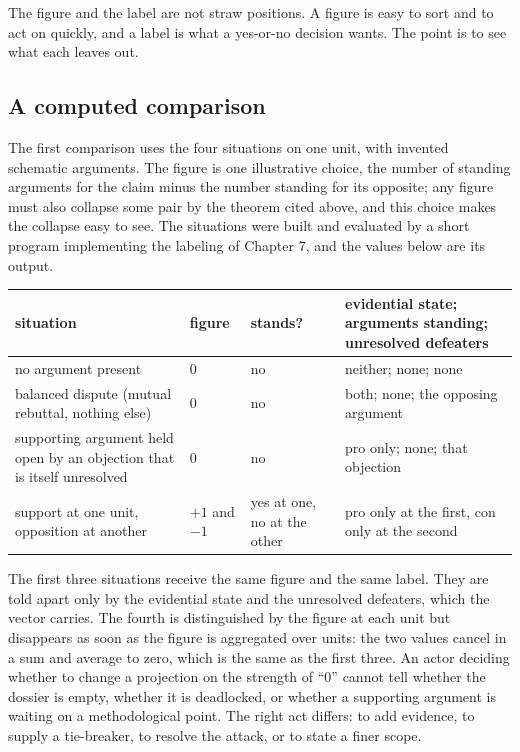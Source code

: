 \documentclass[11pt]{article}
\begin{document}
The figure and the label are not straw positions. A figure is easy to sort and to act on quickly, and a label is what a yes-or-no decision wants. The point is to see what each leaves out.

\subsection{A computed comparison}

The first comparison uses the four situations on one unit, with invented schematic arguments. The figure is one illustrative choice, the number of standing arguments for the claim minus the number standing for its opposite; any figure must also collapse some pair by the theorem cited above, and this choice makes the collapse easy to see. The situations were built and evaluated by a short program implementing the labeling of Chapter 7, and the values below are its output.

\begin{center}
\small
\begin{tabular}{@{}>{\raggedright\arraybackslash}p{} >{\raggedright\arraybackslash}p{} >{\raggedright\arraybackslash}p{} >{\raggedright\arraybackslash}p{}@{}}
\toprule
situation & figure & stands? & evidential state; arguments standing; unresolved defeaters\\
\midrule
no argument present & $0$ & no & neither; none; none\\
balanced dispute (mutual rebuttal, nothing else) & $0$ & no & both; none; the opposing argument\\
supporting argument held open by an objection that is itself unresolved & $0$ & no & pro only; none; that objection\\
support at one unit, opposition at another & $+1$ and $-1$ & yes at one, no at the other & pro only at the first, con only at the second\\
\bottomrule
\end{tabular}
\end{center}

The first three situations receive the same figure and the same label. They are told apart only by the evidential state and the unresolved defeaters, which the vector carries. The fourth is distinguished by the figure at each unit but disappears as soon as the figure is aggregated over units: the two values cancel in a sum and average to zero, which is the same as the first three. An actor deciding whether to change a projection on the strength of ``$0$'' cannot tell whether the dossier is empty, whether it is deadlocked, or whether a supporting argument is waiting on a methodological point. The right act differs: to add evidence, to supply a tie-breaker, to resolve the attack, or to state a finer scope.
\end{document}
